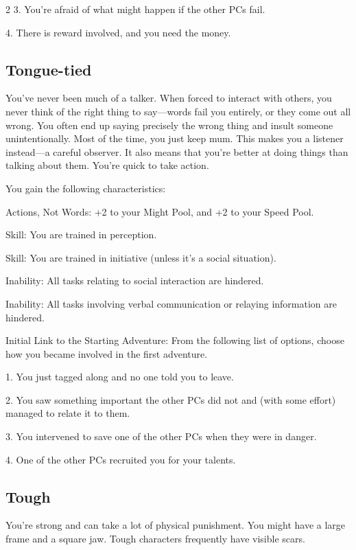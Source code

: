 \begin{multicols}{2}
3. You’re afraid of what might happen if the other PCs fail.

4. There is reward involved, and you need the money.

\subsection{Tongue-tied}

You’ve never been much of a talker. When forced to interact with others, you never think of the right thing to say—words fail you entirely, or they come out all wrong. You often end up saying precisely the wrong thing and insult someone unintentionally. Most of the time, you just keep mum. This makes you a listener instead—a careful observer. It also means that you’re better at doing things than talking about them. You’re quick to take action.

You gain the following characteristics:

Actions, Not Words: +2 to your Might Pool, and +2 to your Speed Pool.

Skill: You are trained in perception.

Skill: You are trained in initiative (unless it’s a social situation).

Inability: All tasks relating to social interaction are hindered.

Inability: All tasks involving verbal communication or relaying information are hindered.

Initial Link to the Starting Adventure: From the following list of options, choose how you became involved in the first adventure.

1. You just tagged along and no one told you to leave.

2. You saw something important the other PCs did not and (with some effort) managed to relate it to them.

3. You intervened to save one of the other PCs when they were in danger.

4. One of the other PCs recruited you for your talents.

\subsection{Tough}

You’re strong and can take a lot of physical punishment. You might have a large frame and a square jaw. Tough characters frequently have visible scars.


\end{multicols}
